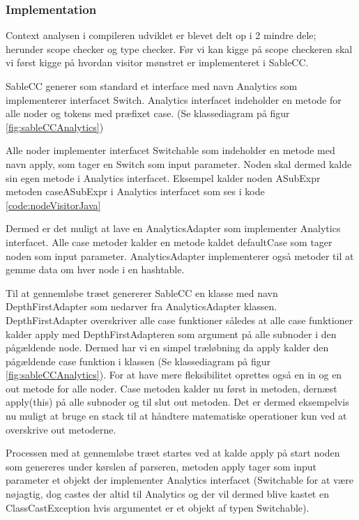 \subsubsection{Implementation}
Context analysen i compileren udviklet er blevet delt op i 2 mindre dele; herunder scope checker og type checker. Før vi kan kigge på scope checkeren skal vi først kigge på hvordan visitor mønstret er implementeret i SableCC.

\label{sct:visitorSableCC}
SableCC generer som standard et interface med navn Analytics som implementerer interfacet Switch. Analytics interfacet indeholder en metode for alle noder og tokens med præfixet case. (Se klassediagram på figur \ref{fig:sableCCAnalytics})

Alle noder implementer interfacet Switchable som indeholder en metode med navn apply, som tager en Switch som input parameter. Noden skal dermed kalde sin egen metode i Analytics interfacet. Eksempel kalder noden ASubExpr metoden caseASubExpr i Analytics interfacet som ses i kode \ref{code:nodeVisitorJava}


Dermed er det muligt at lave en AnalyticsAdapter som implementer Analytics interfacet. Alle case metoder kalder en metode kaldet defaultCase som tager noden som input parameter. AnalyticsAdapter implementerer også metoder til at gemme data om hver node i en hashtable. 

Til at gennemløbe træet genererer SableCC en klasse med navn DepthFirstAdapter som nedarver fra AnalyticsAdapter klassen. DepthFirstAdapter overskriver alle case funktioner således at alle case funktioner kalder apply med DepthFirstAdapteren som argument på alle subnoder i den pågældende node. Dermed har vi en simpel træløbning da apply kalder den pågældende case funktion i klassen (Se klassediagram på figur \ref{fig:sableCCAnalytics}). For at have mere fleksibilitet oprettes også en in og en out metode for alle noder. Case metoden kalder nu først in metoden, dernæst apply(this) på alle subnoder og til slut out metoden. Det er dermed eksempelvis nu muligt at bruge en stack til at håndtere matematiske operationer kun ved at overskrive out metoderne.

Processen med at gennemløbe træet startes ved at kalde apply på start noden som genereres under kørslen af parseren, metoden apply tager som input parameter et objekt der implementer Analytics interfacet (Switchable for at være nøjagtig, dog castes der altid til Analytics og der vil dermed blive kastet en ClassCastException hvis argumentet er et objekt af typen Switchable).

